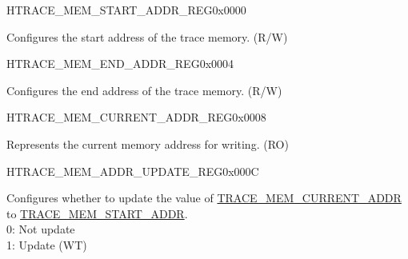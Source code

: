 \begin{register}{H}{TRACE\_MEM\_START\_ADDR\_REG}{0x0000}\label{regdesc:TRACEMEMSTARTADDRREG}
%
\regnewline%
\begin{regdesc}\begin{reglist}
\label{fielddesc:TRACEMEMSTARTADDR}\item [TRACE\_MEM\_START\_ADDR] Configures the start address of the trace memory. (R/W)
\end{reglist}\end{regdesc}
\end{register}


\begin{register}{H}{TRACE\_MEM\_END\_ADDR\_REG}{0x0004}\label{regdesc:TRACEMEMENDADDRREG}
%
\regnewline%
\begin{regdesc}\begin{reglist}
\label{fielddesc:TRACEMEMENDADDR}\item [TRACE\_MEM\_END\_ADDR] Configures the end address of the trace memory. (R/W)
\end{reglist}\end{regdesc}
\end{register}


\begin{register}{H}{TRACE\_MEM\_CURRENT\_ADDR\_REG}{0x0008}\label{regdesc:TRACEMEMCURRENTADDRREG}
%
\regnewline%
\begin{regdesc}\begin{reglist}
\label{fielddesc:TRACEMEMCURRENTADDR}\item [TRACE\_MEM\_CURRENT\_ADDR] Represents the current memory address for writing. (RO)
\end{reglist}\end{regdesc}
\end{register}


\begin{register}{H}{TRACE\_MEM\_ADDR\_UPDATE\_REG}{0x000C}\label{regdesc:TRACEMEMADDRUPDATEREG}
%
%
\regnewline%
\begin{regdesc}\begin{reglist}
\label{fielddesc:TRACEMEMCURRENTADDRUPDATE}\item [TRACE\_MEM\_CURRENT\_ADDR\_UPDATE] Configures whether to update the value of \hyperref[fielddesc:TRACEMEMCURRENTADDR]{TRACE\_MEM\_CURRENT\_ADDR} to \hyperref[fielddesc:TRACEMEMSTARTADDR]{TRACE\_MEM\_START\_ADDR}.\\0: Not update\\1: Update (WT)
\end{reglist}\end{regdesc}
\end{register}


